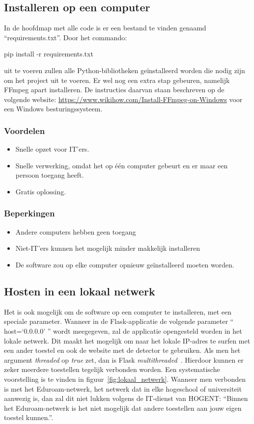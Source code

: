 \subsection{Installeren op een computer}
In de hoofdmap met alle code is er een bestand te vinden genaamd ``requirements.txt''. Door het commando:
\begin{python}
    pip install -r requirements.txt
\end{python}
uit te voeren zullen alle Python-bibliotheken geïnstalleerd worden die nodig zijn om het project uit te voeren. Er wel nog een extra stap gebeuren, namelijk FFmpeg apart installeren. De instructies daarvan staan beschreven op de volgende website: \url{https://www.wikihow.com/Install-FFmpeg-on-Windows} voor een Windows besturingssysteem.

\subsubsection{Voordelen}
\begin{itemize}
    \item Snelle opzet voor IT'ers.
    \item Snelle verwerking, omdat het op één computer gebeurt en er maar een persoon toegang heeft.
    \item Gratis oplossing.
\end{itemize}
\subsubsection{Beperkingen}
\begin{itemize}
    \item Andere computers hebben geen toegang
    \item Niet-IT'ers kunnen het mogelijk minder makkelijk installeren
    \item De software zou op elke computer opnieuw geïnstalleerd moeten worden.
\end{itemize}

\subsection{Hosten in een lokaal netwerk}
Het is ook mogelijk om de software op een computer te installeren, met een speciale parameter. Wanneer in de Flask-applicatie de volgende parameter `` host=`0.0.0.0' '' wordt meegegeven, zal de applicatie opengesteld worden in het lokale netwerk. Dit maakt het mogelijk om naar het lokale IP-adres te surfen met een ander toestel en ook de website met de detector te gebruiken. Als men het argument \textit{threaded} op \textit{true} zet, dan is Flask \textit{multithreaded}~\autocite{Vieira2013}. Hierdoor kunnen er zeker meerdere toestellen tegelijk verbonden worden. Een systematische voorstelling is te vinden in figuur~\ref{fig:lokaal_netwerk}. Wanneer men verbonden is met het Eduroam-netwerk, het netwerk dat in elke hogeschool of universiteit aanwezig is, dan zal dit niet lukken volgens de IT-dienst van HOGENT: ``Binnen het Eduroam-netwerk is het niet mogelijk dat andere toestellen aan jouw eigen toestel kunnen.''.

